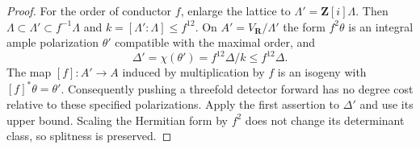 \begin{proof}
For the order of conductor $f$, enlarge the lattice to
$\Lambda'=\mathbf Z[i]\Lambda$. Then
$\Lambda\subset\Lambda'\subset f^{-1}\Lambda$ and
$k=[\Lambda':\Lambda]\le f^{12}$. On
$A'=V_{\mathbf R}/\Lambda'$ the form $f^2\theta$ is an integral
ample polarization $\theta'$ compatible with the maximal order,
and
\[
 \Delta'=\chi(\theta')=f^{12}\Delta/k\le f^{12}\Delta.
\]
The map $[f]:A'\to A$ induced by multiplication by $f$ is an
isogeny with $[f]^*\theta=\theta'$. Consequently pushing a
threefold detector forward has no degree cost relative to these
specified polarizations. Apply the first assertion to $\Delta'$
and use its upper bound. Scaling the Hermitian form by $f^2$ does
not change its determinant class, so splitness is preserved.
\end{proof}
